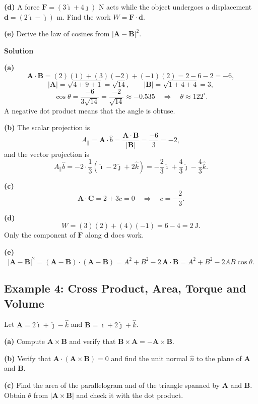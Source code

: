 \documentclass[12pt]{article}
\begin{document}
\textbf{(d)} A force $\mathbf{F} = (3\hat{\imath}+4\hat{\jmath})$ N acts while the object undergoes a displacement $\mathbf{d} = (2\hat{\imath}-\hat{\jmath})$ m. Find the work $W = \mathbf{F}\cdot\mathbf{d}$.

\textbf{(e)} Derive the law of cosines from $|\mathbf{A}-\mathbf{B}|^2$.

\bigskip
\textbf{Solution}

\textbf{(a)}
\[
\mathbf{A}\cdot\mathbf{B} = (2)(1)+(3)(-2)+(-1)(2) = 2-6-2 = -6,
\]
\[
|\mathbf{A}| = \sqrt{4+9+1} = \sqrt{14},
\qquad
|\mathbf{B}| = \sqrt{1+4+4} = 3,
\]
\[
\cos\theta = \frac{-6}{3\sqrt{14}} = \frac{-2}{\sqrt{14}} \approx -0.535
\quad \Longrightarrow \quad \theta \approx 122^\circ .
\]
A negative dot product means that the angle is obtuse.

\textbf{(b)} The scalar projection is
\[
A_{\parallel} = \mathbf{A}\cdot\hat{b} = \frac{\mathbf{A}\cdot\mathbf{B}}{|\mathbf{B}|} = \frac{-6}{3} = -2,
\]
and the vector projection is
\[
A_{\parallel}\hat{b} = -2\cdot\frac{1}{3}\left(\hat{\imath}-2\hat{\jmath}+2\hat{k}\right)
= -\frac{2}{3}\hat{\imath}+\frac{4}{3}\hat{\jmath}-\frac{4}{3}\hat{k}.
\]

\textbf{(c)}
\[
\mathbf{A}\cdot\mathbf{C} = 2 + 3c = 0
\quad \Longrightarrow \quad c = -\frac{2}{3}.
\]

\textbf{(d)}
\[
W = (3)(2)+(4)(-1) = 6-4 = 2\ \text{J}.
\]
Only the component of $\mathbf{F}$ along $\mathbf{d}$ does work.

\textbf{(e)}
\[
|\mathbf{A}-\mathbf{B}|^2 = (\mathbf{A}-\mathbf{B})\cdot(\mathbf{A}-\mathbf{B})
= A^2 + B^2 - 2\,\mathbf{A}\cdot\mathbf{B}
= A^2 + B^2 - 2AB\cos\theta .
\]


\subsection{Example 4: Cross Product, Area, Torque and Volume}

Let $\mathbf{A} = 2\hat{\imath}+\hat{\jmath}-\hat{k}$ and $\mathbf{B} = \hat{\imath}+2\hat{\jmath}+\hat{k}$.

\textbf{(a)} Compute $\mathbf{A}\times\mathbf{B}$ and verify that $\mathbf{B}\times\mathbf{A} = -\mathbf{A}\times\mathbf{B}$.

\textbf{(b)} Verify that $\mathbf{A}\cdot(\mathbf{A}\times\mathbf{B}) = 0$ and find the unit normal $\hat{n}$ to the plane of $\mathbf{A}$ and $\mathbf{B}$.

\textbf{(c)} Find the area of the parallelogram and of the triangle spanned by $\mathbf{A}$ and $\mathbf{B}$. Obtain $\theta$ from $|\mathbf{A}\times\mathbf{B}|$ and check it with the dot product.
\end{document}
